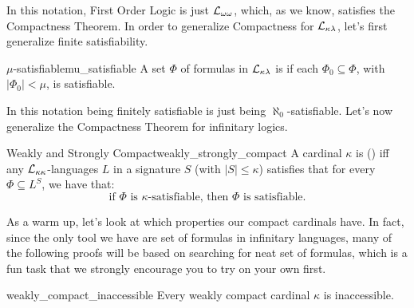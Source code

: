 In this notation, First Order Logic is just $\mathcal{L}_{\omega\omega}$, which, as we know, satisfies the Compactness Theorem. In order to generalize Compactness for $\mathcal{L}_{\kappa\lambda}$, let's first generalize finite satisfiability.

\begin{definition}{$\mu$-satisfiable}{mu_satisfiable}
    A set $\Phi$ of formulas in $\mathcal{L}_{\kappa\lambda}$ is  if each $\Phi_0\subseteq\Phi$, with $\lvert\Phi_0\rvert<\mu$, is satisfiable.
\end{definition}

In this notation being finitely satisfiable is just being $\aleph_0$-satisfiable. Let's now generalize the Compactness Theorem for infinitary logics.

\begin{definition}{Weakly and Strongly Compact}{weakly_strongly_compact}
A cardinal $\kappa$ is  () iff any $\mathcal{L}_{\kappa\kappa}$-languages $L$ in a signature $S$ (with $\lvert S\rvert\leq\kappa$) satisfies that for every $\Phi\subseteq L^S$, we have that:
\vspace{-4pt}
$$\text{if $\Phi$ is $\kappa$-satisfiable, then $\Phi$ is satisfiable.}$$
\end{definition}

As a warm up, let's look at which properties our compact cardinals have. In fact, since the only tool we have are set of formulas in infinitary languages, many of the following proofs will be based on searching for neat set of formulas, which is a fun task that we strongly encourage you to try on your own first.

\begin{theorem}{}{weakly_compact_inaccessible}
    Every weakly compact cardinal $\kappa$ is inaccessible.
\end{theorem}

